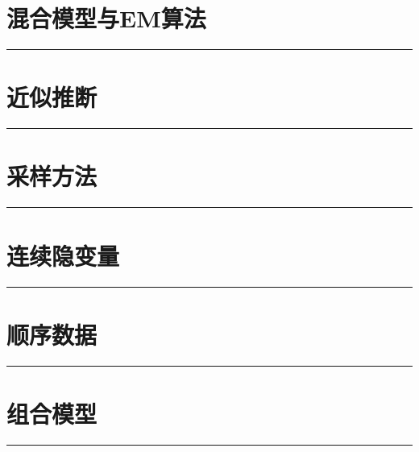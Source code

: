 \documentclass[b5paper]{book}
\renewcommand {\thetable} {\thechapter{}.\arabic{table}}
\renewcommand {\thefigure} {\thechapter{}.\arabic{figure}}
\numberwithin{equation}{chapter}
\begin{document}
	\chapter{混合模型与EM算法}
	\noindent\rule[0.25\baselineskip]{\textwidth}{1pt}
	\renewcommand {\thetable} {\thechapter{}.\arabic{table}}
	\renewcommand {\thefigure} {\thechapter{}.\arabic{figure}}

	\chapter{近似推断}
	\noindent\rule[0.25\baselineskip]{\textwidth}{1pt}
	\renewcommand {\thetable} {\thechapter{}.\arabic{table}}
	\renewcommand {\thefigure} {\thechapter{}.\arabic{figure}}

	\chapter{采样方法}
	\noindent\rule[0.25\baselineskip]{\textwidth}{1pt}
	\renewcommand {\thetable} {\thechapter{}.\arabic{table}}
	\renewcommand {\thefigure} {\thechapter{}.\arabic{figure}}

	\chapter{连续隐变量}
	\noindent\rule[0.25\baselineskip]{\textwidth}{1pt}
	\renewcommand {\thetable} {\thechapter{}.\arabic{table}}
	\renewcommand {\thefigure} {\thechapter{}.\arabic{figure}}

	\chapter{顺序数据}
	\noindent\rule[0.25\baselineskip]{\textwidth}{1pt}
	\renewcommand {\thetable} {\thechapter{}.\arabic{table}}
	\renewcommand {\thefigure} {\thechapter{}.\arabic{figure}}

	\chapter{组合模型}
	\noindent\rule[0.25\baselineskip]{\textwidth}{1pt}
	\renewcommand {\thetable} {\thechapter{}.\arabic{table}}
	\renewcommand {\thefigure} {\thechapter{}.\arabic{figure}}
\end{document}
